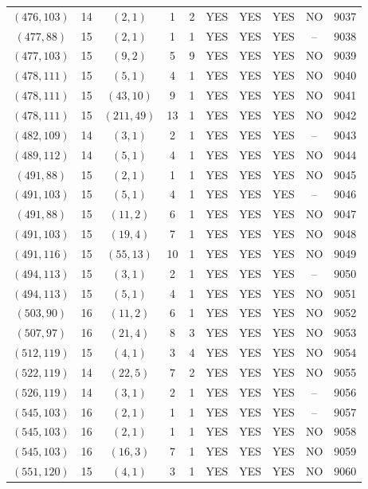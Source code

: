 \begin{longtable}{|c|c|c|c|c|c|c|c|c|c|}
$(476, 103)$ & 14 & $(2, 1)$ & 1 & 2 & YES & YES & YES & NO & 9037\\
$(477, 88)$ & 15 & $(2, 1)$ & 1 & 1 & YES & YES & YES & -- & 9038\\
$(477, 103)$ & 15 & $(9, 2)$ & 5 & 9 & YES & YES & YES & NO & 9039\\
$(478, 111)$ & 15 & $(5, 1)$ & 4 & 1 & YES & YES & YES & NO & 9040\\
$(478, 111)$ & 15 & $(43, 10)$ & 9 & 1 & YES & YES & YES & NO & 9041\\
$(478, 111)$ & 15 & $(211, 49)$ & 13 & 1 & YES & YES & YES & NO & 9042\\
$(482, 109)$ & 14 & $(3, 1)$ & 2 & 1 & YES & YES & YES & -- & 9043\\
$(489, 112)$ & 14 & $(5, 1)$ & 4 & 1 & YES & YES & YES & NO & 9044\\
$(491, 88)$ & 15 & $(2, 1)$ & 1 & 1 & YES & YES & YES & NO & 9045\\
$(491, 103)$ & 15 & $(5, 1)$ & 4 & 1 & YES & YES & YES & -- & 9046\\
$(491, 88)$ & 15 & $(11, 2)$ & 6 & 1 & YES & YES & YES & NO & 9047\\
$(491, 103)$ & 15 & $(19, 4)$ & 7 & 1 & YES & YES & YES & NO & 9048\\
$(491, 116)$ & 15 & $(55, 13)$ & 10 & 1 & YES & YES & YES & NO & 9049\\
$(494, 113)$ & 15 & $(3, 1)$ & 2 & 1 & YES & YES & YES & -- & 9050\\
$(494, 113)$ & 15 & $(5, 1)$ & 4 & 1 & YES & YES & YES & NO & 9051\\
$(503, 90)$ & 16 & $(11, 2)$ & 6 & 1 & YES & YES & YES & NO & 9052\\
$(507, 97)$ & 16 & $(21, 4)$ & 8 & 3 & YES & YES & YES & NO & 9053\\
$(512, 119)$ & 15 & $(4, 1)$ & 3 & 4 & YES & YES & YES & NO & 9054\\
$(522, 119)$ & 14 & $(22, 5)$ & 7 & 2 & YES & YES & YES & NO & 9055\\
$(526, 119)$ & 14 & $(3, 1)$ & 2 & 1 & YES & YES & YES & -- & 9056\\
$(545, 103)$ & 16 & $(2, 1)$ & 1 & 1 & YES & YES & YES & -- & 9057\\
$(545, 103)$ & 16 & $(2, 1)$ & 1 & 1 & YES & YES & YES & NO & 9058\\
$(545, 103)$ & 16 & $(16, 3)$ & 7 & 1 & YES & YES & YES & NO & 9059\\
$(551, 120)$ & 15 & $(4, 1)$ & 3 & 1 & YES & YES & YES & NO & 9060\\

\end{longtable}
